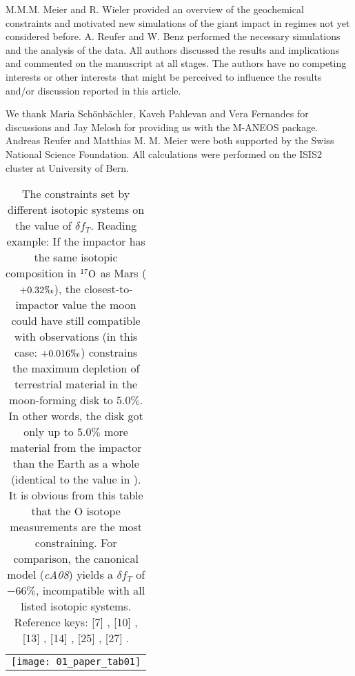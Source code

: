 M.M.M. Meier and R. Wieler provided an overview of the geochemical constraints and motivated new simulations of the giant impact in regimes not yet considered before. A. Reufer and W. Benz performed the necessary simulations and the analysis of the data. All authors discussed the results and implications and commented on the manuscript at all stages. The authors have no competing interests or other interests that might be perceived to influence the results and/or discussion reported in this article.

We thank Maria Schönbächler, Kaveh Pahlevan and Vera Fernandes for discussions and Jay Melosh for providing us with the M-ANEOS package. Andreas Reufer and Matthias M. M. Meier were both supported by the Swiss National Science Foundation. All calculations were performed on the ISIS2 cluster at University of Bern.



\begin{table}
\begin{tabular}{l}
\hspace{-0.8cm} \texttt{[image: 01\_paper\_tab01]}
\end{tabular}
\caption{The constraints set by different isotopic systems on the value of $\delta f_{T}$. Reading example: If the impactor has the same isotopic composition in $\O17$  as Mars ($+0.32 \permil$), the closest-to-impactor value the moon could have still compatible with observations (in this case: $+0.016 \permil$) constrains the maximum depletion of terrestrial material in the moon-forming disk to $5.0\%$. In other words, the disk got only up to $5.0\%$ more material from the impactor than the Earth as a whole (identical to the value in \citep{Wiechert:2001p3543}). It is obvious from this table that the O isotope measurements are the most constraining. For comparison, the canonical model (\emph{cA08}) yields a $\delta f_{T}$ of $-66\%$, incompatible with all listed isotopic systems. Reference keys: [7] \cite{Wiechert:2001p3543}, [10] \cite{2007Natur.447.1102G}, [13] \cite{2000SSRv...92..225S}, [14] \cite{2007Natur.450.1206T}, [25] \cite{2010LPI....41.2653F}, [27] \cite{2009GeCoA..73.5150K}.}
\label{ch05_tbl01}
\end{table}

